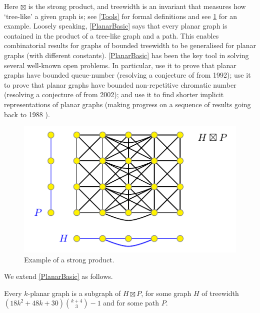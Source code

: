 \documentclass{patmorin}
\begin{document}
Here $\boxtimes$ is the strong product, and treewidth is an invariant that measures how `tree-like' a given graph is; see \cref{Tools} for formal definitions and see \cref{ProductExample} for an example. Loosely speaking, \cref{PlanarBasic} says that every planar graph is contained in the product of a tree-like graph and a path. This enables combinatorial results for graphs of bounded 
treewidth to be generalised for planar graphs (with different constants). \cref{PlanarBasic} has been the key tool in solving several well-known open problems. In particular, \citet{dujmovic.joret.ea:planar} use it to prove that planar graphs have bounded queue-number (resolving a conjecture of \citet{HLR92} from 1992);  \citet{dujmovic.esperet.ea:planar} use it to prove that planar graphs have bounded non-repetitive chromatic number (resolving a conjecture of \citet{AGHR-RSA02} from 2002); and \citet{bonamy.gavoille.ea:shorter} use it to find shorter implicit representations of planar graphs (making progress on a sequence of results going back to 1988 \citep{kannan.naor.ea:implicit-stoc,kannan.naor.ea:implicit}). 

\begin{figure}[hbtp]
\begin{center}
\includegraphics{ProductExample}
\end{center}
\caption{Example of a strong product.}
\label{ProductExample}
\end{figure}

We extend \cref{PlanarBasic} as follows. 

\begin{thm}
\label{kPlanarBasic}
Every $k$-planar graph is a subgraph of $H\boxtimes P$, for some graph $H$ of treewidth $(18k^2+48k+30)\binom{k+4}{3}-1$ and for some path $P$. 
\end{thm}
\end{document}
